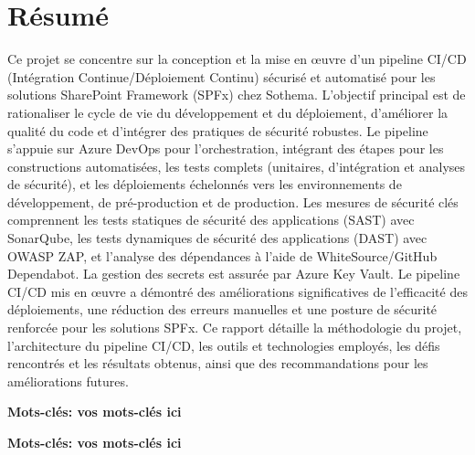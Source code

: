 \chapter*{Résumé}
\normalsize{

 Ce projet se concentre sur la conception et la mise en œuvre d'un pipeline CI/CD (Intégration Continue/Déploiement Continu) sécurisé et automatisé pour les solutions SharePoint Framework (SPFx) chez Sothema. L'objectif principal est de rationaliser le cycle de vie du développement et du déploiement, d'améliorer la qualité du code et d'intégrer des pratiques de sécurité robustes. Le pipeline s'appuie sur Azure DevOps pour l'orchestration, intégrant des étapes pour les constructions automatisées, les tests complets (unitaires, d'intégration et analyses de sécurité), et les déploiements échelonnés vers les environnements de développement, de pré-production et de production. Les mesures de sécurité clés comprennent les tests statiques de sécurité des applications (SAST) avec SonarQube, les tests dynamiques de sécurité des applications (DAST) avec OWASP ZAP, et l'analyse des dépendances à l'aide de WhiteSource/GitHub Dependabot. La gestion des secrets est assurée par Azure Key Vault. Le pipeline CI/CD mis en œuvre a démontré des améliorations significatives de l'efficacité des déploiements, une réduction des erreurs manuelles et une posture de sécurité renforcée pour les solutions SPFx. Ce rapport détaille la méthodologie du projet, l'architecture du pipeline CI/CD, les outils et technologies employés, les défis rencontrés et les résultats obtenus, ainsi que des recommandations pour les améliorations futures.
}

\medskip
{\noindent \textbf{Mots-clés: vos mots-clés ici} }

\medskip
{\noindent \textbf{Mots-clés: vos mots-clés ici} }
